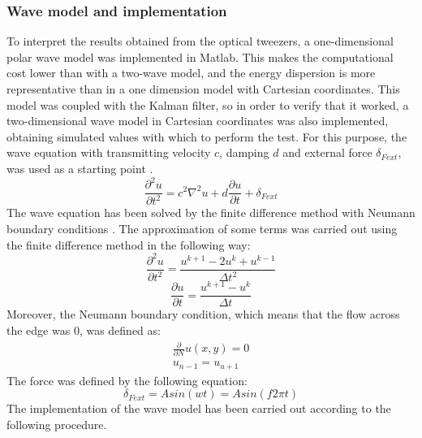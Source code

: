\documentclass[12pt, a4paper]{article} %
\begin{document}
\subsubsection{Wave model and implementation}

To interpret the results obtained from the optical tweezers, a one-dimensional polar wave model was implemented in Matlab. This makes the computational cost lower than with a two-wave model, and the energy dispersion is more representative than in a one dimension model with Cartesian coordinates. This model was coupled with the Kalman filter, so in order to verify that it worked, a two-dimensional wave model in Cartesian coordinates was also implemented, obtaining simulated values with which to perform the test. For this purpose, the wave equation with transmitting velocity $c$, damping $d$ and external force $\delta_{Fext}$, was used as a starting point \cite{achenbach2012wave, d'alembert_1749}.
\setlength{\parskip}{4mm}
\begin{equation} \label{eqn:wave_model}
   \frac{\partial^{2}u}{\partial t^{2}} = c^{2}\nabla^{2}u + d\frac{\partial u}{\partial t} + \delta_{Fext}
\end{equation}
The wave equation has been solved by the finite difference method \cite{petter2017finite} with Neumann boundary conditions \cite{mathews2000metodos}. The approximation of some terms was carried out using the finite difference method in the following way:
\begin{equation} \label{eqn:deltau_deltat2}
   \frac{\partial^{2}u}{\partial t^{2}} = \frac{u^{k + 1} - 2u^{k} + u^{k - 1}}{\Delta t^{2}} 
\end{equation}
\begin{equation} \label{eqn:deltau_deltat}
   \frac{\partial u}{\partial t} = \frac{u^{k + 1} - u^{k}}{\Delta t}
\end{equation}
Moreover, the Neumann boundary condition, which means that the flow across the edge was 0, was defined as:
\begin{equation} \label{eqn:neumann}
	\begin{array}{ l }
 \frac{\partial}{\partial N} u(x, y) = 0\\
 u_{n-1} = u_{u+1}
	\end{array}
\end{equation}
The force was defined by the following equation:
\begin{equation} \label{eqn:force}
    \delta_{Fext} = Asin(wt) = Asin(f2\pi t)
\end{equation}
The implementation of the wave model has been carried out according to the following procedure.
\end{document}
